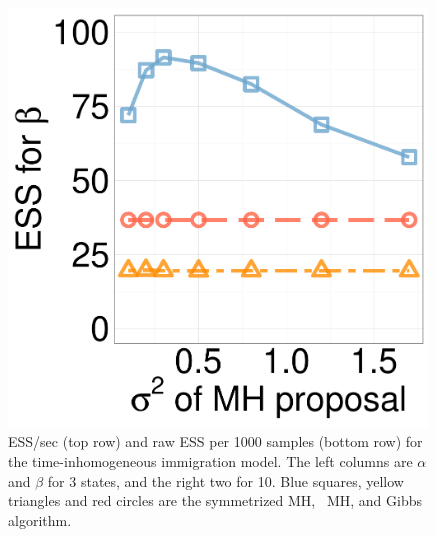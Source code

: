 \begin{figure}[H]
\begin{minipage}[hp]{0.24\linewidth}
	\end{minipage}
  \begin{minipage}[hp]{0.24\linewidth}
  \centering
    \includegraphics [width=0.99\textwidth, angle=0]{figs/ess/QC_D10beta_k2.pdf}
	\end{minipage}
    \caption{ESS/sec (top row) and raw ESS per 1000 samples (bottom row) for the time-inhomogeneous immigration model. The left columns are $\alpha$ and $\beta$ for 3 states, and the right two for 10. {Blue squares, yellow triangles and red circles} are the symmetrized MH, \naive\ MH, and Gibbs algorithm. }
     \label{fig:ESS_pc_10}
  \end{figure}



